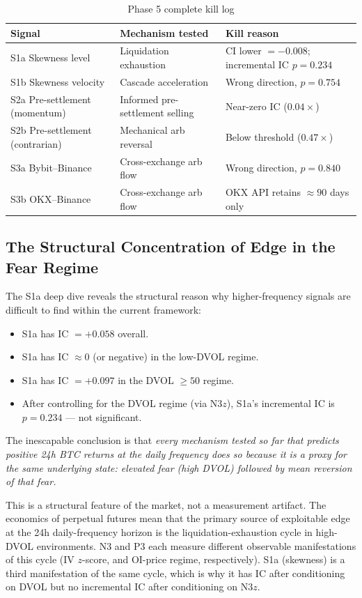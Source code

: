 \documentclass[12pt, a4paper]{article}
\theoremstyle{plain}
\theoremstyle{definition}
\begin{document}
\begin{table}[H]
\centering
\caption{Phase 5 complete kill log}
\label{tab:kills}
\begin{tabular}{lll}
\toprule
Signal & Mechanism tested & Kill reason \\
\midrule
S1a Skewness level & Liquidation exhaustion & CI lower $= -0.008$; incremental IC $p = 0.234$ \\
S1b Skewness velocity & Cascade acceleration & Wrong direction, $p = 0.754$ \\
S2a Pre-settlement (momentum) & Informed pre-settlement selling & Near-zero IC ($0.04\times$) \\
S2b Pre-settlement (contrarian) & Mechanical arb reversal & Below threshold ($0.47\times$) \\
S3a Bybit--Binance & Cross-exchange arb flow & Wrong direction, $p = 0.840$ \\
S3b OKX--Binance & Cross-exchange arb flow & OKX API retains $\approx 90$ days only \\
\bottomrule
\end{tabular}
\end{table}

\subsection{The Structural Concentration of Edge in the Fear Regime}

The S1a deep dive reveals the structural reason why higher-frequency
signals are difficult to find within the current framework:

\begin{itemize}
  \item S1a has IC $= +0.058$ overall.
  \item S1a has IC $\approx 0$ (or negative) in the low-DVOL regime.
  \item S1a has IC $= +0.097$ in the DVOL $\geq 50$ regime.
  \item After controlling for the DVOL regime (via N3$z$), S1a's
        incremental IC is $p = 0.234$ --- not significant.
\end{itemize}

The inescapable conclusion is that \emph{every mechanism tested so far
that predicts positive 24h BTC returns at the daily frequency does so
because it is a proxy for the same underlying state: elevated fear
(high DVOL) followed by mean reversion of that fear.}

This is a structural feature of the market, not a measurement artifact.
The economics of perpetual futures mean that the primary source of
exploitable edge at the 24h daily-frequency horizon is the
liquidation-exhaustion cycle in high-DVOL environments.  N3 and P3
each measure different observable manifestations of this cycle
(IV $z$-score, and OI-price regime, respectively).  S1a (skewness)
is a third manifestation of the same cycle, which is why it has IC
after conditioning on DVOL but no incremental IC after conditioning on N3$z$.
\end{document}
